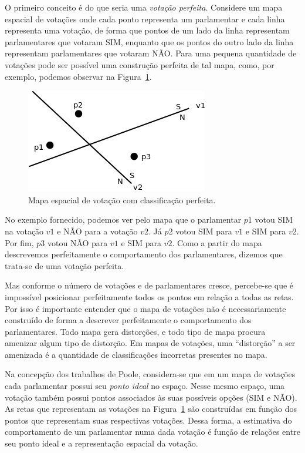 \documentclass[a4paper, 12pt]{article}
\newcommand\nay{NÃO\xspace}
\newcommand\yea{SIM\xspace}
\begin{document}
O primeiro conceito é do que seria uma \emph{votação perfeita}. Considere um mapa espacial de votações onde cada ponto representa um parlamentar e cada linha representa uma votação, de forma que pontos de um lado da linha representam parlamentares que votaram \yea, enquanto que os pontos do outro lado da linha representam parlamentares que votaram \nay. Para uma pequena quantidade de votações pode ser possível uma construção perfeita de tal mapa, como, por exemplo, podemos observar na Figura~\ref{fig:mapa-classificacao-perfeita}.

\begin{figure}[h]
  \centering
  \includegraphics[scale=0.7]{figs/votacao-perfeita.png}
  \caption{Mapa espacial de votação com classificação perfeita.}
  \label{fig:mapa-classificacao-perfeita}
\end{figure}

No exemplo fornecido, podemos ver pelo mapa que o parlamentar $p1$ votou \yea na votação $v1$ e \nay para a votação $v2$. Já $p2$ votou \yea para $v1$ e \yea para $v2$. Por fim, $p3$ votou \nay para $v1$ e \yea para $v2$. Como a partir do mapa descrevemos perfeitamente o comportamento dos parlamentares, dizemos que trata-se de uma votação perfeita.

Mas conforme o número de votações e de parlamentares cresce, percebe-se que é impossível posicionar perfeitamente todos os pontos em relação a todas as retas. Por isso é importante entender que o mapa de votações não é necessariamente construído de forma a descrever perfeitamente o comportamento dos parlamentares. Todo mapa gera distorções, e todo tipo de mapa procura amenizar algum tipo de distorção. Em mapas de votações, uma ``distorção'' a ser amenizada é a quantidade de classificações incorretas presentes no mapa.

Na concepção dos trabalhos de Poole, considera-se que em um mapa de votações cada parlamentar possui seu \emph{ponto ideal} no espaço. Nesse mesmo espaço, uma votação também possui pontos associados às suas possíveis opções (\yea e \nay). As retas que representam as votações na Figura~\ref{fig:mapa-classificacao-perfeita} são construídas em função dos pontos que representam suas respectivas votações. Dessa forma, a estimativa do comportamento de um parlamentar numa dada votação é função de relações entre seu ponto ideal e a representação espacial da votação. 
\end{document}
